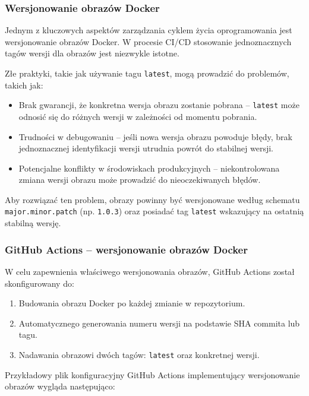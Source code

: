 \subsubsection{Wersjonowanie obrazów Docker}

Jednym z kluczowych aspektów zarządzania cyklem życia oprogramowania jest wersjonowanie obrazów Docker. W procesie CI/CD stosowanie jednoznacznych tagów wersji dla obrazów jest niezwykle istotne. 

Złe praktyki, takie jak używanie tagu \texttt{latest}, mogą prowadzić do problemów, takich jak:
\begin{itemize}
    \item Brak gwarancji, że konkretna wersja obrazu zostanie pobrana – \texttt{latest} może odnosić się do różnych wersji w zależności od momentu pobrania.
    \item Trudności w debugowaniu – jeśli nowa wersja obrazu powoduje błędy, brak jednoznacznej identyfikacji wersji utrudnia powrót do stabilnej wersji.
    \item Potencjalne konflikty w środowiskach produkcyjnych – niekontrolowana zmiana wersji obrazu może prowadzić do nieoczekiwanych błędów.
\end{itemize}

Aby rozwiązać ten problem, obrazy powinny być wersjonowane według schematu \texttt{major.minor.patch} (np. \texttt{1.0.3}) oraz posiadać tag \texttt{latest} wskazujący na ostatnią stabilną wersję.

\subsubsection{GitHub Actions – wersjonowanie obrazów Docker}

W celu zapewnienia właściwego wersjonowania obrazów, GitHub Actions został skonfigurowany do:
\begin{enumerate}
    \item Budowania obrazu Docker po każdej zmianie w repozytorium.
    \item Automatycznego generowania numeru wersji na podstawie SHA commita lub tagu.
    \item Nadawania obrazowi dwóch tagów: \texttt{latest} oraz konkretnej wersji.
\end{enumerate}

Przykładowy plik konfiguracyjny GitHub Actions implementujący wersjonowanie obrazów wygląda następująco:


